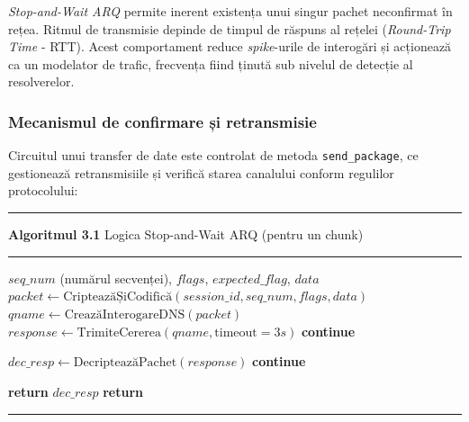 \textit{Stop-and-Wait ARQ} permite inerent existența unui singur pachet neconfirmat în rețea. Ritmul de transmisie depinde de timpul de răspuns al rețelei (\textit{Round-Trip Time} - RTT). Acest comportament reduce \textit{spike}-urile de interogări și acționează ca un modelator de trafic, frecvența fiind ținută sub nivelul de detecție al resolverelor.

\subsubsection{Mecanismul de confirmare și retransmisie}
Circuitul unui transfer de date este controlat de metoda \texttt{send\_package}, ce gestionează retransmisiile și verifică starea canalului conform regulilor protocolului:

\begingroup
\singlespacing
\noindent\rule{\textwidth}{0.8pt}
\vspace{-0.15cm}

\noindent \textbf{Algoritmul 3.1} Logica Stop-and-Wait ARQ (pentru un chunk)
\vspace{-0.15cm}

\noindent\rule{\textwidth}{0.4pt}
\vspace{0.1cm}

\begin{algorithmic}[1]
\Require $seq\_num$ (numărul secvenței), $flags$, $expected\_flag$, $data$
\State $packet \gets \text{CripteazăȘiCodifică}(session\_id, seq\_num, flags, data)$
\State $qname \gets \text{CreazăInterogareDNS}(packet)$
    \State $response \gets \text{TrimiteCererea}(qname, \text{timeout} = 3s)$
        \State \textbf{continue} 
    \EndIf
    
    \State $dec\_resp \gets \text{DecripteazăPachet}(response)$
        \State \textbf{continue} 
    \EndIf
    
        \State \textbf{return} $dec\_resp$ 
    \EndIf
\EndFor
\State \textbf{return}  
\end{algorithmic}
\vspace{-0.2cm}
\noindent\rule{\textwidth}{0.8pt}
\endgroup

